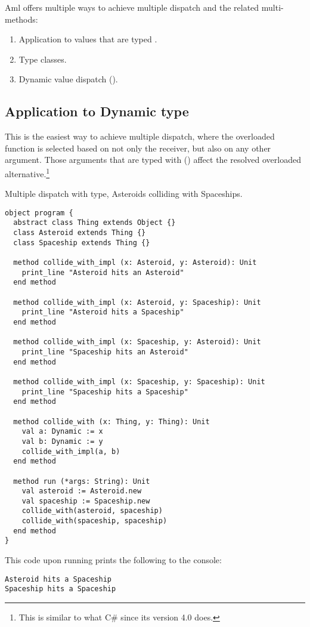 Aml offers multiple ways to achieve multiple dispatch and the related multi-methods: 

\begin{enumerate}
  \item Application to values that are typed .
  \item Type classes. 
  \item Dynamic value dispatch (). 
\end{enumerate}




\subsection{Application to Dynamic type}

This is the easiest way to achieve multiple dispatch, where the overloaded function is selected based on not only the receiver, but also on any other argument. Those arguments that are typed with  () affect the resolved overloaded alternative.\footnote{This is similar to what C\# since its version 4.0 does.}

\example Multiple dispatch with  type, Asteroids colliding with Spaceships.  
\begin{lstlisting}[morekeywords={Dynamic}]
object program {
  abstract class Thing extends Object {}
  class Asteroid extends Thing {}
  class Spaceship extends Thing {}
  
  method collide_with_impl (x: Asteroid, y: Asteroid): Unit
    print_line "Asteroid hits an Asteroid"
  end method
  
  method collide_with_impl (x: Asteroid, y: Spaceship): Unit
    print_line "Asteroid hits a Spaceship"
  end method
  
  method collide_with_impl (x: Spaceship, y: Asteroid): Unit
    print_line "Spaceship hits an Asteroid"
  end method
  
  method collide_with_impl (x: Spaceship, y: Spaceship): Unit
    print_line "Spaceship hits a Spaceship"
  end method
  
  method collide_with (x: Thing, y: Thing): Unit
    val a: Dynamic := x
    val b: Dynamic := y
    collide_with_impl(a, b)
  end method
  
  method run (*args: String): Unit
    val asteroid := Asteroid.new
    val spaceship := Spaceship.new
    collide_with(asteroid, spaceship)
    collide_with(spaceship, spaceship)
  end method
}
\end{lstlisting}
This code upon running  prints the following to the console:
\begin{lstlisting}
Asteroid hits a Spaceship
Spaceship hits a Spaceship
\end{lstlisting}





